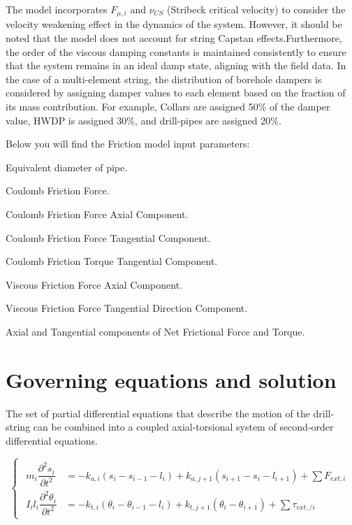 The model incorporates $F_{\mu,i}$ and $\nu_{CS}$ (Stribeck critical velocity) to consider the velocity weakening effect in the dynamics of the system. However, it should be noted that the model does not account for string Capstan effects.Furthermore, the order of the viscous damping constants is maintained consistently to ensure that the system remains in an ideal damp state, aligning with the field data. In the case of a multi-element string, the distribution of borehole dampers is considered by assigning damper values to each element based on the fraction of its mass contribution. For example, Collars are assigned 50\% of the damper value, HWDP is assigned 30\%, and drill-pipes are assigned 20\%. 

Below you will find the Friction model input parameters:
\begin{bulletedlist}
    \item Equivalent diameter of pipe.
    \item Coulomb Friction Force.
    \item Coulomb Friction Force Axial Component.
    \item Coulomb Friction Force Tangential Component.
    \item Coulomb Friction Torque Tangential Component.
    \item Viscous Friction Force Axial Component.
    \item Viscous Friction Force Tangential Direction Component.
    \item Axial and Tangential components of Net Frictional Force and Torque.
\end{bulletedlist}

\section{Governing equations and solution}

The set of partial differential equations that describe the motion of the drill-string can be combined into a coupled axial-torsional system of second-order differential equations. 

\begin{equation}\label{Governing equations}
  \begin{cases}
   \begin{aligned}
     m_{i}\dfrac{\partial^{2}s_{i}}{\partial t^{2}} & = -k_{a,i}(s_{i}-s_{i-1}-l_{i}) + k_{a,j+1}(s_{i+1}-s_{i}-l_{i+1}) + \sum{F_{ext, i}} \\
     I_{i}l_{i}\dfrac{\partial^{2}\theta_{i}}{\partial t^{2}} & = -k_{t,i}(\theta_{i}-\theta_{i-1}-l_{i}) + k_{t,j+1}(\theta_{i}-\theta_{i+1}) + \sum{\tau_{ext,/ i}}
   \end{aligned}
  \end{cases}
\end{equation}

